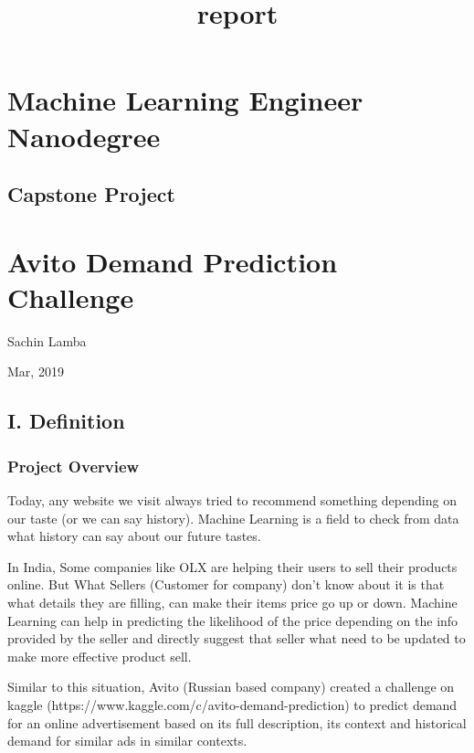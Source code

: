 \documentclass[11pt]{article}
\title{report}
\begin{document}
    
    
    \maketitle
    
    

    
    \section{Machine Learning Engineer
Nanodegree}\label{machine-learning-engineer-nanodegree}

    \subsection{Capstone Project}\label{capstone-project}

\section{Avito Demand Prediction
Challenge}\label{avito-demand-prediction-challenge}

Sachin Lamba

Mar, 2019

    \subsection{I. Definition}\label{i.-definition}

    \subsubsection{Project Overview}\label{project-overview}

    Today, any website we visit always tried to recommend something
depending on our taste (or we can say history). Machine Learning is a
field to check from data what history can say about our future tastes.

In India, Some companies like OLX are helping their users to sell their
products online. But What Sellers (Customer for company) don't know
about it is that what details they are filling, can make their items
price go up or down. Machine Learning can help in predicting the
likelihood of the price depending on the info provided by the seller and
directly suggest that seller what need to be updated to make more
effective product sell.

Similar to this situation, Avito (Russian based company) created a
challenge on kaggle (https://www.kaggle.com/c/avito-demand-prediction)
to predict demand for an online advertisement based on its full
description, its context and historical demand for similar ads in
similar contexts.
\end{document}
